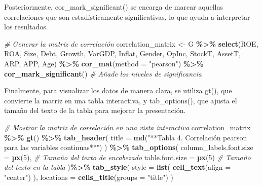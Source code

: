\documentclass[
]{article}
\newenvironment{Shaded}{\begin{snugshade}}{\end{snugshade}}
\newcommand{\AttributeTok}[1]{\textcolor[rgb]{0.13,0.29,0.53}{#1}}
\newcommand{\CommentTok}[1]{\textcolor[rgb]{0.56,0.35,0.01}{\textit{#1}}}
\newcommand{\DecValTok}[1]{\textcolor[rgb]{0.00,0.00,0.81}{#1}}
\newcommand{\FunctionTok}[1]{\textcolor[rgb]{0.13,0.29,0.53}{\textbf{#1}}}
\newcommand{\NormalTok}[1]{#1}
\newcommand{\OtherTok}[1]{\textcolor[rgb]{0.56,0.35,0.01}{#1}}
\newcommand{\SpecialCharTok}[1]{\textcolor[rgb]{0.81,0.36,0.00}{\textbf{#1}}}
\newcommand{\StringTok}[1]{\textcolor[rgb]{0.31,0.60,0.02}{#1}}
\begin{document}
Posteriormente, cor\_mark\_significant() se encarga de marcar aquellas
correlaciones que son estadísticamente significativas, lo que ayuda a
interpretar los resultados.

\begin{Shaded}
\begin{Highlighting}[]
\CommentTok{\# Generar la matriz de correlación}
\NormalTok{correlation\_matrix }\OtherTok{\textless{}{-}}\NormalTok{ G }\SpecialCharTok{\%\textgreater{}\%}
  \FunctionTok{select}\NormalTok{(ROE, ROA, Size, Debt, Growth, VarGDP, Inflat, Gender, OpInc, StockT, }
\NormalTok{         AssetT, ARP, APP, Age) }\SpecialCharTok{\%\textgreater{}\%}
  \FunctionTok{cor\_mat}\NormalTok{(}\AttributeTok{method =} \StringTok{"pearson"}\NormalTok{) }\SpecialCharTok{\%\textgreater{}\%}
  \FunctionTok{cor\_mark\_significant}\NormalTok{() }\CommentTok{\# Añade los niveles de significancia}
\end{Highlighting}
\end{Shaded}

Finalmente, para visualizar los datos de manera clara, se utiliza gt(),
que convierte la matriz en una tabla interactiva, y tab\_options(), que
ajusta el tamaño del texto de la tabla para mejorar la presentación.

\begin{Shaded}
\begin{Highlighting}[]
\CommentTok{\# Mostrar la matriz de correlación en una vista interactiva}
\NormalTok{correlation\_matrix  }\SpecialCharTok{\%\textgreater{}\%} 
  \FunctionTok{gt}\NormalTok{() }\SpecialCharTok{\%\textgreater{}\%}
  \FunctionTok{tab\_header}\NormalTok{(}
    \AttributeTok{title =} \FunctionTok{md}\NormalTok{(}\StringTok{"**Tabla 4. Correlación pearson para las variables continuas**"}\NormalTok{)}
\NormalTok{  ) }\SpecialCharTok{\%\textgreater{}\%}
  \FunctionTok{tab\_options}\NormalTok{(}
    \AttributeTok{column\_labels.font.size =} \FunctionTok{px}\NormalTok{(}\DecValTok{5}\NormalTok{), }\CommentTok{\# Tamaño del texto de encabezado}
    \AttributeTok{table.font.size =} \FunctionTok{px}\NormalTok{(}\DecValTok{5}\NormalTok{) }\CommentTok{\# Tamaño del texto en la tabla}
\NormalTok{  )}\SpecialCharTok{\%\textgreater{}\%}
  \FunctionTok{tab\_style}\NormalTok{(}
    \AttributeTok{style =} \FunctionTok{list}\NormalTok{(}
      \FunctionTok{cell\_text}\NormalTok{(}\AttributeTok{align =} \StringTok{"center"}\NormalTok{)  }
\NormalTok{    ),}
    \AttributeTok{locations =} \FunctionTok{cells\_title}\NormalTok{(}\AttributeTok{groups =} \StringTok{"title"}\NormalTok{)  }
\NormalTok{  )}
\end{Highlighting}
\end{Shaded}
\end{document}
